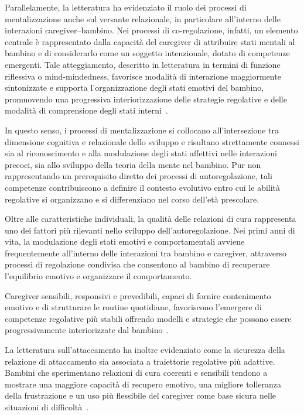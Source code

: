         Parallelamente, la letteratura ha evidenziato il ruolo dei processi di mentalizzazione anche sul versante relazionale, in particolare all'interno delle interazioni caregiver--bambino. Nei processi di co-regolazione, infatti, un elemento centrale è rappresentato dalla capacità del caregiver di attribuire stati mentali al bambino e di considerarlo come un soggetto intenzionale, dotato di competenze emergenti. Tale atteggiamento, descritto in letteratura in termini di funzione riflessiva o mind-mindedness, favorisce modalità di interazione maggiormente sintonizzate e supporta l'organizzazione degli stati emotivi del bambino, promuovendo una progressiva interiorizzazione delle strategie regolative e delle modalità di comprensione degli stati interni~\cite{slade2005,meins2001}.

        In questo senso, i processi di mentalizzazione si collocano all'intersezione tra dimensione cognitiva e relazionale dello sviluppo e risultano strettamente connessi sia al riconoscimento e alla modulazione degli stati affettivi nelle interazioni precoci, sia allo sviluppo della teoria della mente nel bambino. Pur non rappresentando un prerequisito diretto dei processi di autoregolazione, tali competenze contribuiscono a definire il contesto evolutivo entro cui le abilità regolative si organizzano e si differenziano nel corso dell'età prescolare.

        Oltre alle caratteristiche individuali, la qualità delle relazioni di cura rappresenta uno dei fattori più rilevanti nello sviluppo dell'autoregolazione. Nei primi anni di vita, la modulazione degli stati emotivi e comportamentali avviene frequentemente all'interno delle interazioni tra bambino e caregiver, attraverso processi di regolazione condivisa che consentono al bambino di recuperare l'equilibrio emotivo e organizzare il comportamento.

        Caregiver sensibili, responsivi e prevedibili, capaci di fornire contenimento emotivo e di strutturare le routine quotidiane, favoriscono l'emergere di competenze regolative più stabili offrendo modelli e strategie che possono essere progressivamente interiorizzate dal bambino~\cite{calkins2007hill}.

        La letteratura sull'attaccamento ha inoltre evidenziato come la sicurezza della relazione di attaccamento sia associata a traiettorie regolative più adattive. Bambini che sperimentano relazioni di cura coerenti e sensibili tendono a mostrare una maggiore capacità di recupero emotivo, una migliore tolleranza della frustrazione e un uso più flessibile del caregiver come base sicura nelle situazioni di difficoltà~\cite{sroufe1996}.


